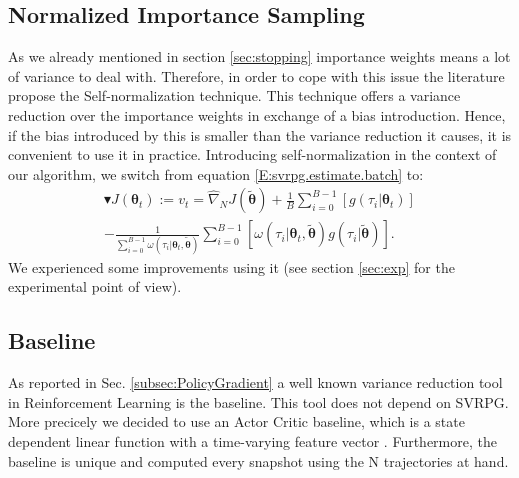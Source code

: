 \documentclass{article}
\theoremstyle{remark}
\theoremstyle{definition}
\newcommand{\vtheta}{\boldsymbol{\theta}}
\newcommand{\wt}[1]{\widetilde{#1}}
\newcommand{\wh}[1]{\widehat{#1}}
\begin{document}
\subsection{Normalized Importance Sampling}\label{sec:prac}
As we already mentioned in section \ref{sec:stopping} importance weights means a lot of variance to deal with. Therefore, in order to cope with this issue the literature propose the Self-normalization technique.
This technique offers a variance reduction over the importance weights in exchange of a bias introduction. Hence, if the bias introduced by this is smaller than the variance reduction it causes, it is convenient to use it in practice.  
Introducing self-normalization in the context of our algorithm, we switch from equation \ref{E:svrpg.estimate.batch} to:
\begin{align*}
\blacktriangledown J(\vtheta_{t}) := v_t= \wh{\nabla}_N J(\wt{\vtheta})
 + \frac{1}{B} \sum_{i=0}^{B-1} \left[
g(\tau_i|\vtheta_t)\right]\\ 
- \frac{1}{ \sum_{i=0}^{B-1}\omega(\tau_i|\vtheta_t, \wt{\vtheta})} \sum_{i=0}^{B-1} \left[ \omega(\tau_i|\vtheta_t, \wt{\vtheta}) g(\tau_i|\wt{\vtheta})
\right].
\end{align*}
We experienced some improvements using it (see section \ref{sec:exp} for the experimental point of view).

\subsection{Baseline}
As reported in Sec. \ref{subsec:PolicyGradient} a well known variance reduction tool in Reinforcement Learning is the baseline.
This tool does not depend on SVRPG. More precicely we decided to use an Actor Critic baseline, which is a state dependent linear function with a time-varying feature vector \cite{duan2016benchmarking}. Furthermore, the baseline is unique and computed every snapshot using the N trajectories at hand.
\end{document}
